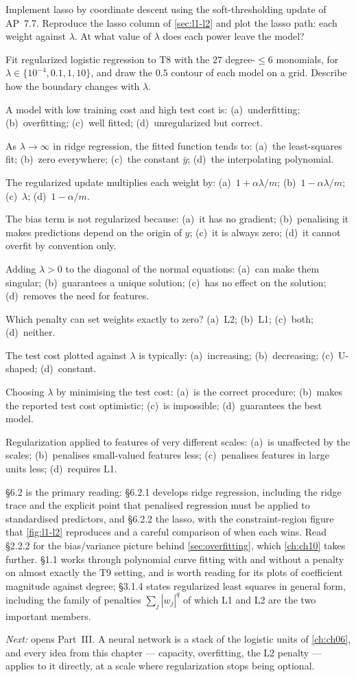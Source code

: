 \pe Implement lasso by coordinate descent using the soft-thresholding update of
AP~7.7. Reproduce the lasso column of \cref{sec:l1-l2} and plot the lasso path:
each weight against $\lambda$. At what value of $\lambda$ does each power leave
the model?

\pe Fit regularized logistic regression to T8 with the $27$ degree-$\le6$
monomials, for $\lambda \in \{10^{-4}, 0.1, 1, 10\}$, and draw the $0.5$
contour of each model on a grid. Describe how the boundary changes with
$\lambda$.


\qz A model with low training cost and high test cost is: (a)~underfitting;
(b)~overfitting; (c)~well fitted; (d)~unregularized but correct.

\qz As $\lambda \to \infty$ in ridge regression, the fitted function tends to:
(a)~the least-squares fit; (b)~zero everywhere; (c)~the constant $\bar y$;
(d)~the interpolating polynomial.

\qz The regularized update multiplies each weight by: (a)~$1 + \alpha\lambda/m$;
(b)~$1 - \alpha\lambda/m$; (c)~$\lambda$; (d)~$1 - \alpha/m$.

\qz The bias term is not regularized because: (a)~it has no gradient;
(b)~penalising it makes predictions depend on the origin of $y$; (c)~it is
always zero; (d)~it cannot overfit by convention only.

\qz Adding $\lambda > 0$ to the diagonal of the normal equations: (a)~can make
them singular; (b)~guarantees a unique solution; (c)~has no effect on the
solution; (d)~removes the need for features.

\qz Which penalty can set weights exactly to zero? (a)~L2; (b)~L1; (c)~both;
(d)~neither.

\qz The test cost plotted against $\lambda$ is typically: (a)~increasing;
(b)~decreasing; (c)~U-shaped; (d)~constant.

\qz Choosing $\lambda$ by minimising the test cost: (a)~is the correct
procedure; (b)~makes the reported test cost optimistic; (c)~is impossible;
(d)~guarantees the best model.

\qz Regularization applied to features of very different scales: (a)~is
unaffected by the scales; (b)~penalises small-valued features less;
(c)~penalises features in large units less; (d)~requires L1.

\furtherreading

\textcite{james2021} §6.2 is the primary reading: §6.2.1 develops ridge
regression, including the ridge trace and the explicit point that penalised
regression must be applied to standardised predictors, and §6.2.2 the lasso,
with the constraint-region figure that \cref{fig:l1-l2} reproduces and a careful
comparison of when each wins. Read §2.2.2 for the bias/variance picture behind
\cref{sec:overfitting}, which \cref{ch:ch10} takes further.
\textcite{bishop2006} §1.1 works through polynomial curve fitting with and
without a penalty on almost exactly the T9 setting, and is worth reading for its
plots of coefficient magnitude against degree; §3.1.4 states regularized least
squares in general form, including the family of penalties $\sum_j|w_j|^q$ of
which L1 and L2 are the two important members.

\bigskip
\noindent\emph{Next:}  opens Part~III. A neural network is a
stack of the logistic units of \cref{ch:ch06}, and every idea from this chapter
--- capacity, overfitting, the L2 penalty --- applies to it directly, at a scale
where regularization stops being optional.
